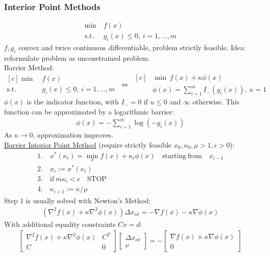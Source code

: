 \documentclass[a4paper,landscape,8pt,fleqn]{scrartcl}
\newcommand{\Me}[1]{\begin{bmatrix}#1\end{bmatrix}} %
\begin{document}
\begin{multicols}{3}
\subsubsection{Interior Point Methods}
\begin{align*}
	\min&~ f(x) \\
	\mathrm{s.t.}&~ g_i(x) \leq 0, ~ i = 1,\dots,m
\end{align*}
$f,g_i$ convex and twice continuous differentiable, problem strictly feasible. Idea: reformulate problem as unconstrained problem. \\
Barrier Method:
\begin{equation*}
\begin{aligned}[c]
	\min&~ f(x) \\
	\mathrm{s.t.}&~ g_i(x) \leq 0, ~ i = 1,\dots,m
\end{aligned}
~\Leftrightarrow~
\begin{aligned}[c]
	&\min~ f(x) + \kappa \phi(x) \\
	&\phi(x) = \sum_{i=1}^m I_{-}(g_i(x)),~ \kappa = 1
\end{aligned}
\end{equation*}
$\phi(x)$ is the indicator function, with $I_{-} = 0$ if $u\leq0$ and $\infty$ otherwise. This function can be approximated by a logarithmic barrier:
\begin{align*}
	\phi(x) = -\sum_{i=1}^m \log(-g_i(x))
\end{align*}
As $\kappa \rightarrow 0$, approximation improves.\\
\underline{Barrier Interior Point Method} (require strictly feasible $x_0,\kappa_0,\mu>1,\epsilon>0$):
\begin{align*}
	1.~&x^*(\kappa_i) = \min_x f(x) + \kappa_i \phi(x) \quad \mathrm{starting~from}\quad x_{i-1} \\
	2.~&x_i := x^*(\kappa_i) \\
	3.~& \mathrm{if~} m\kappa_i < \epsilon \mathrm{\quad STOP}\\
	4.~& \kappa_{i+1} := \kappa/\mu 
\end{align*}
Step $1$ is usually solved with Newton's Method:
\begin{align*}
	(\nabla^2 f(x)+ \kappa \nabla^2 \phi(x)) \Delta x_{nt} = - \nabla f(x) -  \kappa\nabla \phi(x)
\end{align*}
With additional equality constraints $Cx = d$:
\begin{align*}
	\Me{\nabla^2 f(x)+ \kappa \nabla^2 \phi(x) & C^T \\ C & 0}\Me{\Delta x_{nt} \\ \nu} = - \Me{\nabla f(x) +  \kappa\nabla \phi(x) \\ 0}

\end{align*}
\end{multicols}
\end{document}
